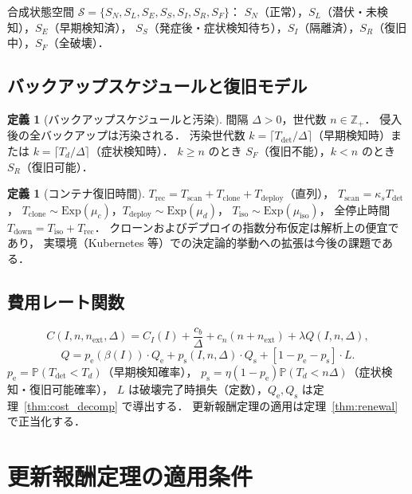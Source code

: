 \documentclass[12pt,a4paper]{article}
\theoremstyle{plain}
\theoremstyle{definition}
\newtheorem{definition}[theorem]{定義}
\theoremstyle{remark}
\newcommand{\Prob}{\mathbb{P}}
\newcommand{\Z}{\mathbb{Z}}
\newcommand{\pe}{p_{\mathrm{e}}}
\newcommand{\ps}{p_{\mathrm{s}}}
\newcommand{\Qe}{Q_{\mathrm{e}}}
\newcommand{\Qs}{Q_{\mathrm{s}}}
\newcommand{\Tdet}{T_{\mathrm{det}}}
\newcommand{\Trec}{T_{\mathrm{rec}}}
\newcommand{\Tdown}{T_{\mathrm{down}}}
\newcommand{\betaI}{\beta(I)}
\begin{document}
合成状態空間 $\mathcal{S}=\{S_N,S_L,S_E,S_S,S_I,S_R,S_F\}$：
$S_N$（正常），$S_L$（潜伏・未検知），$S_E$（早期検知済），
$S_S$（発症後・症状検知待ち），$S_I$（隔離済），$S_R$（復旧中），$S_F$（全破壊）．

\subsection{バックアップスケジュールと復旧モデル}

\begin{definition}[バックアップスケジュールと汚染]\label{def:backup}
間隔 $\Delta>0$，世代数 $n\in\Z_+$．
侵入後の全バックアップは汚染される．
汚染世代数 $k=\lceil\Tdet/\Delta\rceil$（早期検知時）または $k=\lceil T_d/\Delta\rceil$（症状検知時）．
$k\ge n$ のとき $S_F$（復旧不能），$k<n$ のとき $S_R$（復旧可能）．
\end{definition}

\begin{definition}[コンテナ復旧時間]\label{def:recovery}
$\Trec=T_{\mathrm{scan}}+T_{\mathrm{clone}}+T_{\mathrm{deploy}}$（直列），
$T_{\mathrm{scan}}=\kappa_s\Tdet$，
$T_{\mathrm{clone}}\sim\mathrm{Exp}(\mu_c)$，$T_{\mathrm{deploy}}\sim\mathrm{Exp}(\mu_d)$，
$T_{\mathrm{iso}}\sim\mathrm{Exp}(\mu_{\mathrm{iso}})$，
全停止時間 $\Tdown=T_{\mathrm{iso}}+\Trec$．
クローンおよびデプロイの指数分布仮定は解析上の便宜であり，
実環境（Kubernetes 等）での決定論的挙動への拡張は今後の課題である．
\end{definition}

\subsection{費用レート関数}

\begin{equation}\label{eq:cost_rate}
C(I,n,n_{\mathrm{ext}},\Delta)
= C_I(I)+\frac{c_b}{\Delta}+c_n(n+n_{\mathrm{ext}})+\lambda Q(I,n,\Delta),
\end{equation}
\begin{equation}\label{eq:Q_decomp}
Q = \pe(\betaI)\cdot\Qe+\ps(I,n,\Delta)\cdot\Qs
+[1-\pe-\ps]\cdot L.
\end{equation}
$\pe=\Prob(\Tdet<T_d)$（早期検知確率），
$\ps=\eta(1-\pe)\Prob(T_d<n\Delta)$（症状検知・復旧可能確率），
$L$ は破壊完了時損失（定数），$\Qe,\Qs$ は定理~\ref{thm:cost_decomp} で導出する．
更新報酬定理の適用は定理~\ref{thm:renewal} で正当化する．

\section{更新報酬定理の適用条件}
\label{sec:renewal}
\end{document}

